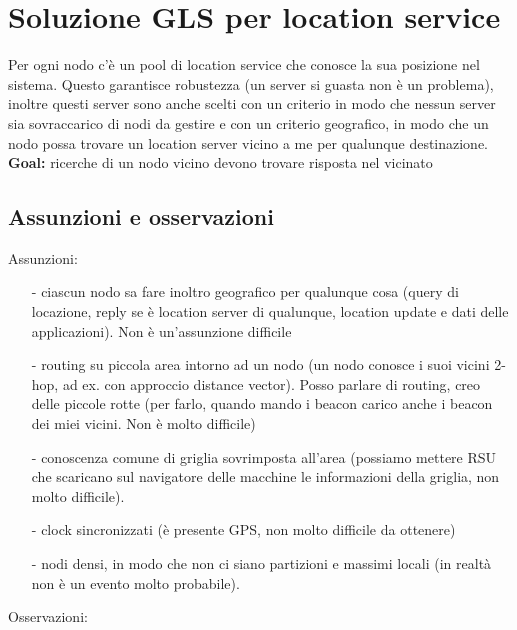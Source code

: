 \documentclass[12pt,italian]{report}
\begin{document}
\section{Soluzione GLS per location service}
Per ogni nodo c'è un pool di location service che conosce la sua posizione nel sistema. Questo garantisce robustezza (un server si guasta non è un problema), inoltre questi server sono anche scelti con un criterio in modo che nessun server sia sovraccarico di nodi da gestire e con un criterio geografico, in modo che un nodo possa trovare un location server vicino a me per qualunque destinazione.
\bigbreak
\noindent \textbf{Goal:} ricerche di un nodo vicino devono trovare risposta nel vicinato
\bigbreak
\subsection{Assunzioni e osservazioni}
\noindent Assunzioni:
\begin{itemize}
    \item [-] ciascun nodo sa fare inoltro geografico per qualunque cosa (query di locazione, reply se è location server di qualunque, location update e dati delle applicazioni). Non è un'assunzione difficile
    \item [-] routing su piccola area intorno ad un nodo (un nodo conosce i suoi vicini 2-hop, ad ex. con approccio distance vector). Posso parlare di routing, creo delle piccole rotte (per farlo, quando mando i beacon carico anche i beacon dei miei vicini. Non è molto difficile)
    \item [-] conoscenza comune di griglia sovrimposta all'area (possiamo mettere RSU che scaricano sul navigatore delle macchine le informazioni della griglia, non molto difficile). 
    \item [-] clock sincronizzati (è presente GPS, non molto difficile da ottenere)
    \item [-] nodi densi, in modo che non ci siano partizioni e massimi locali (in realtà non è un evento molto probabile). 
\end{itemize}
\bigbreak
\noindent Osservazioni:
\end{document}
